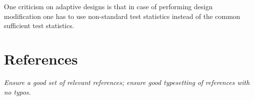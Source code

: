 \documentclass[12pt,a4paper]{article}
\begin{document}
One criticism on adaptive designs is that in case of performing design modification one has to use non-standard test statistics instead of the common sufficient test statistics.

\section*{References}

{\itshape Ensure a good set of relevant references; ensure good typesetting of references with no typos.}


% 
% 
\end{document}
